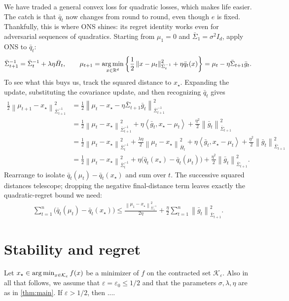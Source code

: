 \documentclass{article}
\newcommand{\R}{\mathbb R}
\newcommand{\K}{\mathcal K}
\newcommand{\argmin}{\operatornamewithlimits{arg\,min}}
\newcommand{\1}{\mathbf 1}
\newcommand{\eps}{\varepsilon}
\newcommand{\ip}[2]{\left\langle #1,#2\right\rangle}
\newcommand{\normm}[2]{\left\lVert #1\right\rVert_{#2}}
\begin{document}
We have traded a general convex loss for quadratic losses, which makes
life easier. The catch is that $\bar{q}_t$ now changes from round to round,
even though $e$ is fixed. Thankfully, this is where ONS shines: its
regret identity works even for adversarial sequences of quadratics.
Starting from $\mu_1=0$ and $\bar{\Sigma}_1=\sigma^2I_d$, apply ONS to $\bar{q}_t$:
\begin{align}
    \bar{\Sigma}_{t+1}^{-1}
    =\bar{\Sigma}_t^{-1}+\lambda\eta \bar{H}_t,\qquad
    \mu_{t+1}
    =\argmin_{x\in\R^d}
    \left\{\frac12\normm{x-\mu_t}{\bar{\Sigma}_t^{-1}}^2+\eta \bar{q}_t(x)\right\}
    =\mu_t-\eta\bar{\Sigma}_{t+1}\bar{g}_t.
\end{align}
To see what this buys us, track the squared distance to $x_\star$.
Expanding the update, substituting the covariance update, and then
recognizing $\bar{q}_t$ gives
\begin{align}
    \frac12\normm{\mu_{t+1}-x_\star}{\bar{\Sigma}_{t+1}^{-1}}^2
     & =\frac12\normm{\mu_t-x_\star-\eta\bar{\Sigma}_{t+1}\bar{g}_t}
    {\bar{\Sigma}_{t+1}^{-1}}^2                                      \\
     & =\frac12\normm{\mu_t-x_\star}{\bar{\Sigma}_{t+1}^{-1}}^2
    +\eta\ip{\bar{g}_t}{x_\star-\mu_t}
    +\frac{\eta^2}{2}\normm{\bar{g}_t}{\bar{\Sigma}_{t+1}}^2         \\
     & =\frac12\normm{\mu_t-x_\star}{\bar{\Sigma}_t^{-1}}^2
    +\frac{\lambda\eta}{2}\normm{\mu_t-x_\star}{\bar{H}_t}^2
    +\eta\ip{\bar{g}_t}{x_\star-\mu_t}
    +\frac{\eta^2}{2}\normm{\bar{g}_t}{\bar{\Sigma}_{t+1}}^2         \\
     & =\frac12\normm{\mu_t-x_\star}{\bar{\Sigma}_t^{-1}}^2
    +\eta\bigl(\bar{q}_t(x_\star)-\bar{q}_t(\mu_t)\bigr)
    +\frac{\eta^2}{2}\normm{\bar{g}_t}{\bar{\Sigma}_{t+1}}^2.
    \label{eq:ons-regret-identity}
\end{align}
Rearrange to isolate $\bar{q}_t(\mu_t)-\bar{q}_t(x_\star)$ and sum over $t$.
The successive squared distances telescope; dropping the negative
final-distance term leaves exactly the quadratic-regret bound we need:
\begin{align}
    \sum_{t=1}^n\bigl(\bar{q}_t(\mu_t)-\bar{q}_t(x_\star)\bigr)
    \leq\frac{\normm{\mu_1-x_\star}{\bar{\Sigma}_1^{-1}}^2}{2\eta}
    +\frac\eta2\sum_{t=1}^n\normm{\bar{g}_t}{\bar{\Sigma}_{t+1}}^2.
\end{align}

\section{Stability and regret}
\label{sec:stability}
\label{sec:stochastic-control}
Let $x_\star \in\argmin_{x\in\K_\eps}f(x)$ be a minimizer of $f$ on the contracted set $\K_\eps$.
Also in all that follows, we assume that $\eps=\eps_0\leq1/2$ and that the parameters $\sigma,\lambda,\eta$ are as in \cref{thm:main}.
If $\eps>1/2$, then ....
\end{document}
